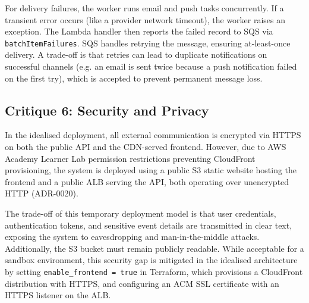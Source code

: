For delivery failures, the worker runs email and push tasks concurrently. If a transient error occurs (like a provider network timeout), the worker raises an exception. The Lambda handler then reports the failed record to SQS via \texttt{batchItemFailures}. SQS handles retrying the message, ensuring at-least-once delivery. A trade-off is that retries can lead to duplicate notifications on successful channels (e.g. an email is sent twice because a push notification failed on the first try), which is accepted to prevent permanent message loss.


\subsection{Critique 6: Security and Privacy}
In the idealised deployment, all external communication is encrypted via HTTPS on both the public API and the CDN-served frontend. However, due to AWS Academy Learner Lab permission restrictions preventing CloudFront provisioning, the system is deployed using a public S3 static website hosting the frontend and a public ALB serving the API, both operating over unencrypted HTTP (ADR-0020). 

The trade-off of this temporary deployment model is that user credentials, authentication tokens, and sensitive event details are transmitted in clear text, exposing the system to eavesdropping and man-in-the-middle attacks. Additionally, the S3 bucket must remain publicly readable. While acceptable for a sandbox environment, this security gap is mitigated in the idealised architecture by setting \texttt{enable\_frontend = true} in Terraform, which provisions a CloudFront distribution with HTTPS, and configuring an ACM SSL certificate with an HTTPS listener on the ALB.

